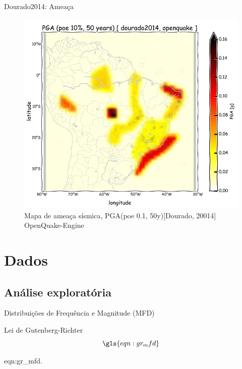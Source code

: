 \documentclass[ucs,8pt]{beamer}
\begin{document}
\begin{frame}{Dourado2014: Ameaça}
\begin{figure}[H]
  \centering
  \includegraphics[height=.95\textheight]{pga_dourado_oq} 
  \caption{Mapa de ameaça sísmica, PGA(poe 0.1, 50y)[Dourado, 20014] OpenQuake-Engine }
  \label{fig:pga_dourado_oq} 
\end{figure}
\end{frame}



\section{Dados}
\subsection{Análise exploratória}


\begin{frame}{Distribuições de Frequência e Magnitude (MFD)}
	\begin{block}{Lei de Gutenberg-Richter}
		\begin{equation}
			\gls{eqn:gr_mfd}
			\label{eq:gr_mfd}
		\end{equation}
	\end{block}
	\small
	\glsdesc*{eqn:gr_mfd}.
\end{frame}
\end{document}
